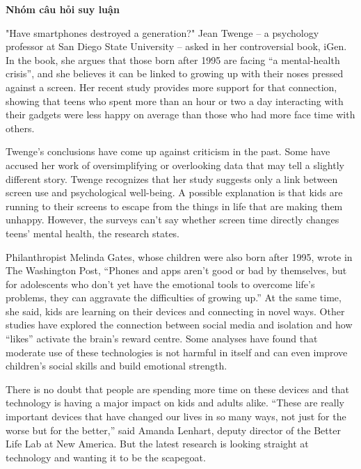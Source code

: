 \documentclass[12pt,a4paper,twoside]{article}
\newcounter{qcounter}
\newenvironment{readingpassage}[1][]{%
    \begin{tcolorbox}[enhanced, colback=grayLight, colframe=secondaryBlue,
        coltitle=textDark, fonttitle=\bfseries, title={#1},
        rounded corners, arc=3mm, boxrule=1pt,
        left=15pt, right=15pt, top=10pt, bottom=10pt,
        breakable, before skip=10pt, after skip=10pt, drop fuzzy shadow]
    \setstretch{1.3}
}{\end{tcolorbox}}
\begin{document}
\setcounter{qcounter}{0}
\begin{groupbox}\textbf{\large Nhóm câu hỏi suy luận}\end{groupbox}
\begin{readingpassage}[]
"Have smartphones destroyed a generation?" Jean Twenge – a psychology professor at San Diego State University – asked in her controversial book, iGen. In the book, she argues that those born after 1995 are facing “a mental-health crisis”, and she believes it can be linked to growing up with their noses pressed against a screen. Her recent study provides more support for that connection, showing that teens who spent more than an hour or two a day interacting with their gadgets were less happy on average than those who had more face time with others.

Twenge’s conclusions have come up against criticism in the past. Some have accused her work of oversimplifying or overlooking data that may tell a slightly different story. Twenge recognizes that her study suggests only a link between screen use and psychological well-being. A possible explanation is that kids are running to their screens to escape from the things in life that are making them unhappy. However, the surveys can’t say whether screen time directly changes teens’ mental health, the research states.

Philanthropist Melinda Gates, whose children were also born after 1995, wrote in The Washington Post, “Phones and apps aren’t good or bad by themselves, but for adolescents who don’t yet have the emotional tools to overcome life’s problems, they can aggravate the difficulties of growing up.” At the same time, she said, kids are learning on their devices and connecting in novel ways. Other studies have explored the connection between social media and isolation and how “likes” activate the brain’s reward centre. Some analyses have found that moderate use of these technologies is not harmful in itself and can even improve children’s social skills and build emotional strength.

There is no doubt that people are spending more time on these devices and that technology is having a major impact on kids and adults alike. “These are really important devices that have changed our lives in so many ways, not just for the worse but for the better,” said Amanda Lenhart, deputy director of the Better Life Lab at New America. But the latest research is looking straight at technology and wanting it to be the scapegoat.
\end{readingpassage}
\end{document}
